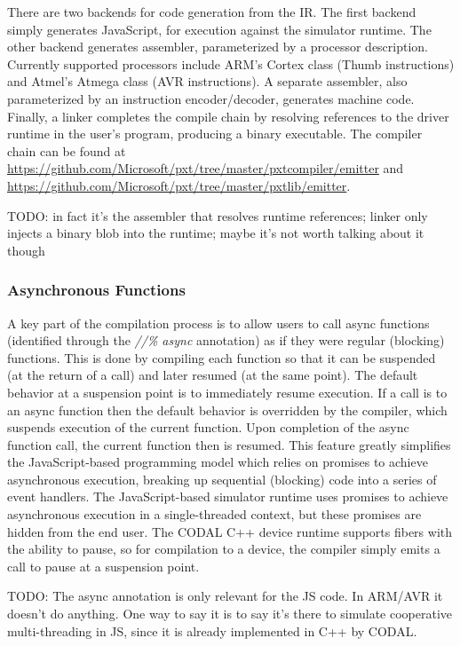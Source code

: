 There are two backends for code generation from the IR. The first backend simply generates JavaScript,
for execution against the simulator runtime.  The other backend generates assembler, parameterized by a
processor description.  Currently supported processors include ARM's Cortex class (Thumb instructions)
and Atmel's Atmega class (AVR instructions). A separate assembler, also parameterized by an instruction
encoder/decoder, generates machine code. Finally, a linker completes the compile chain by resolving
references to the driver runtime in the user's program, producing a binary executable. The compiler chain
can be found at \url{https://github.com/Microsoft/pxt/tree/master/pxtcompiler/emitter} and 
\url{https://github.com/Microsoft/pxt/tree/master/pxtlib/emitter}.

TODO: in fact it's the assembler that resolves runtime references; linker only injects a binary blob into the runtime; maybe it's not worth talking about it though

\subsubsection{Asynchronous Functions}

A key part of the compilation process is to allow users to call async functions (identified through
the \emph{//\% async} annotation) as if they were regular (blocking) functions.  This is done by
compiling each function so that it can be suspended (at the return of a call) and later resumed (at the same point). 
The default behavior at a suspension point is to immediately resume execution.  If a call is to an async function then
the default behavior is overridden by the compiler, which suspends execution of the current function. Upon completion
of the async function call, the current function then is resumed.    This feature greatly simplifies the JavaScript-based
programming model which relies on promises to achieve asynchronous execution, breaking up sequential (blocking) code into
a series of event handlers.  The JavaScript-based simulator runtime uses promises to achieve asynchronous execution in a
single-threaded context, but these promises are hidden from the end user.    The CODAL C++ device runtime supports fibers
with the ability to pause, so for compilation to a device, the compiler simply emits a call to pause at a suspension point. 

TODO: The async annotation is only relevant for the JS code. In ARM/AVR it doesn't do anything.
One way to say it is to say it's there to simulate cooperative multi-threading in JS, since
it is already implemented in C++ by CODAL.

